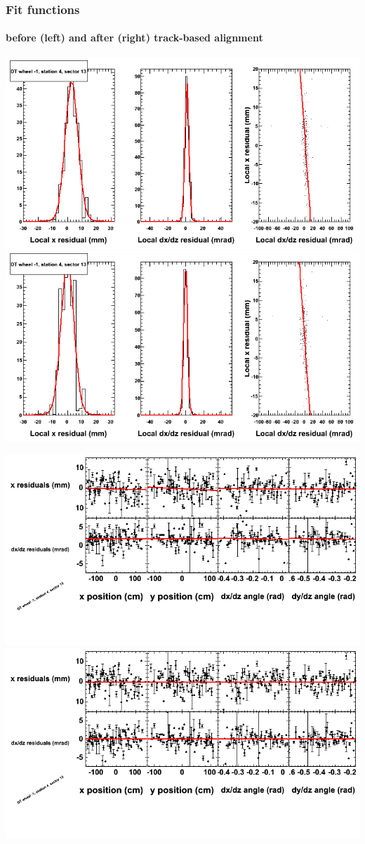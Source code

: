 \documentclass[compress]{beamer}
\begin{document}
\begin{frame}
\frametitle{Fit functions}
\framesubtitle{before (left) and after (right) track-based alignment}
\includegraphics[width=0.5\linewidth]{fitfunctions_re01/MBwhBst4sec13_bellcurves.png} \includegraphics[width=0.5\linewidth]{fitfunctions_re05/MBwhBst4sec13_bellcurves.png}

\includegraphics[width=0.5\linewidth]{fitfunctions_re01/MBwhBst4sec13_polynomials.png} \includegraphics[width=0.5\linewidth]{fitfunctions_re05/MBwhBst4sec13_polynomials.png}
\end{frame}
\end{document}

